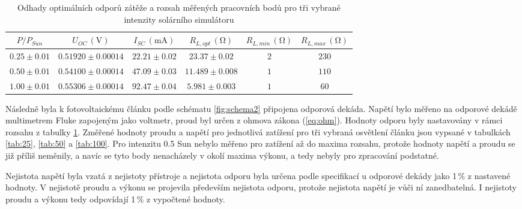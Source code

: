 \documentclass{../concepts/prepareprotokol} %
\begin{document}
\begin{table}[hbtp]
\centering
\caption{Odhady optimálních odporů zátěže a rozsah měřených pracovních bodů pro tři vybrané intenzity solárního simulátoru}
\begin{tabular}{cccccc}
 \toprule
 $P/P_{Sun}$ & $U_{OC}\, (\mathrm{V})$ & $I_{SC}\, (\mathrm{mA})$ & $R_{L,opt}\, (\mathrm{\Omega})$ & $R_{L,min}\, (\mathrm{\Omega})$ & $R_{L,max}\, (\mathrm{\Omega})$ \\
 \midrule
 $0.25 \pm 0.01$ & $0.51920 \pm 0.00014$ & $22.21 \pm 0.02$ & $23.37 \pm 0.02$ & $2$ & $230$ \\
 $0.50 \pm 0.01$ & $0.54100 \pm 0.00014$ & $47.09 \pm 0.03$ & $11.489 \pm 0.008$ & $1$ & $110$ \\
 $1.00 \pm 0.01$ & $0.55306 \pm 0.00014$ & $92.47 \pm 0.04$ & $5.981 \pm 0.003$ & $1$ & $60$ \\
 \bottomrule
\end{tabular}
\label{tab:rlopt}
\end{table}

Následně byla k fotovoltaickému článku podle schématu \ref{fig:schema2} připojena odporová dekáda. Napětí bylo měřeno na odporové dekádě multimetrem Fluke zapojeným jako voltmetr, proud byl určen z ohmova zákona (\ref{eq:ohm}). Hodnoty odporu byly nastavovány v rámci rozsahu z tabulky \ref{tab:rlopt}. Změřené hodnoty proudu a napětí pro jednotlivá zatížení pro tři vybraná osvětlení článku jsou vypsané v tabulkách \ref{tab:25}, \ref{tab:50} a \ref{tab:100}. Pro intenzitu 0.5 Sun nebylo měřeno pro zatížení až do maxima rozsahu, protože hodnoty napětí a proudu se již příliš neměnily, a navíc se tyto body nenacházely v okolí maxima výkonu, a tedy nebyly pro zpracování podstatné.

Nejistota napětí byla vzatá z nejistoty přístroje a nejistota odporu byla určena podle specifikací u odporové dekády jako 1\,\% z nastavené hodnoty. V nejistotě proudu a výkonu se projevila především nejistota odporu, protože nejistota napětí je vůči ní zanedbatelná. I nejistoty proudu a výkonu tedy odpovídají 1\,\% z vypočtené hodnoty.
\end{document}
